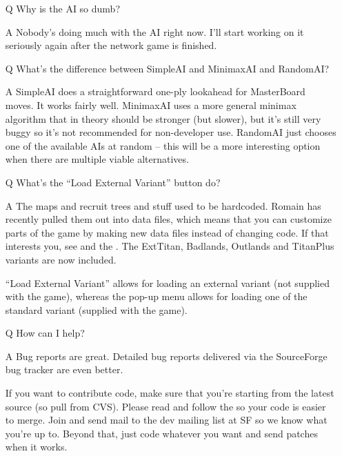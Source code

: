 \documentclass{article}
\begin{document}
\begin{itemize}
\item[Q] Why is the AI so dumb?

\item[A] Nobody's doing much with the AI right now. I'll start working
 on it seriously again after the network game is finished.


\item[Q] What's the difference between SimpleAI and MinimaxAI and RandomAI?

\item[A] SimpleAI does a straightforward one-ply lookahead for MasterBoard
 moves. It works fairly well. MinimaxAI uses a more general minimax 
 algorithm that in theory should be stronger (but slower), but it's 
 still very buggy so it's not recommended for non-developer use. 
 RandomAI just chooses one of the available AIs at random -- this 
 will be a more interesting option when there are multiple viable 
 alternatives.


\item[Q] What's the ``Load External Variant'' button do? 

\item[A] The maps and recruit trees and stuff used to be hardcoded. Romain
 has recently pulled them out into data files, which means that you
 can customize parts of the game by making new data files instead of
 changing code. If that interests you, see
 and the
 .
 The ExtTitan, Badlands, Outlands and TitanPlus variants are now included.

 ``Load External Variant'' allows for loading an external variant
 (not supplied with the game), whereas the pop-up menu allows
 for loading one of the standard variant (supplied with the game).

\item[Q] How can I help?

\item[A] Bug reports are great. Detailed bug reports delivered via the 
 SourceForge bug tracker are even better. 
 
 If you want to contribute code, make sure that you're starting 
 from the latest source (so pull from CVS). Please read and follow
 the 
 so your code is easier to merge. Join and send mail to the dev mailing
 list at SF so we know what you're up to. Beyond that, just code whatever
 you want and send  patches when it works.

\end{itemize}
\end{document}
